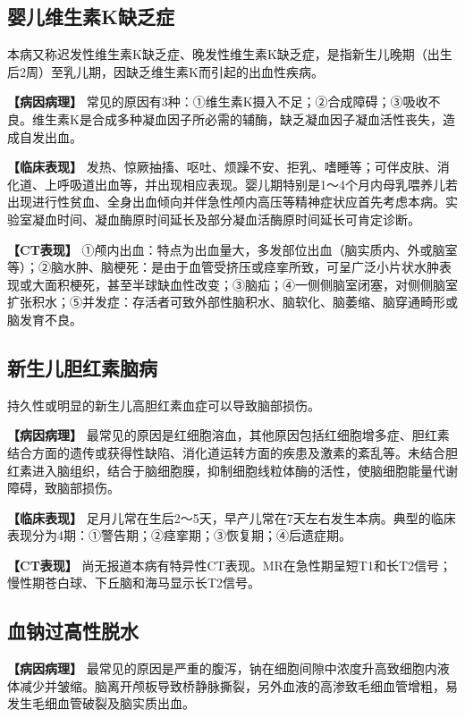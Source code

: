 \subsection{婴儿维生素K缺乏症}

本病又称迟发性维生素K缺乏症、晚发性维生素K缺乏症，是指新生儿晚期（出生后2周）至乳儿期，因缺乏维生素K而引起的出血性疾病。

\textbf{【病因病理】}
常见的原因有3种：①维生素K摄入不足；②合成障碍；③吸收不良。维生素K是合成多种凝血因子所必需的辅酶，缺乏凝血因子凝血活性丧失，造成自发出血。

\textbf{【临床表现】}
发热、惊厥抽搐、呕吐、烦躁不安、拒乳、嗜睡等；可伴皮肤、消化道、上呼吸道出血等，并出现相应表现。婴儿期特别是1～4个月内母乳喂养儿若出现进行性贫血、全身出血倾向并伴急性颅内高压等精神症状应首先考虑本病。实验室凝血时间、凝血酶原时间延长及部分凝血活酶原时间延长可肯定诊断。

\textbf{【CT表现】}
①颅内出血：特点为出血量大，多发部位出血（脑实质内、外或脑室等）；②脑水肿、脑梗死：是由于血管受挤压或痉挛所致，可呈广泛小片状水肿表现或大面积梗死，甚至半球缺血性改变；③脑疝；④一侧侧脑室闭塞，对侧侧脑室扩张积水；⑤并发症：存活者可致外部性脑积水、脑软化、脑萎缩、脑穿通畸形或脑发育不良。

\subsection{新生儿胆红素脑病}

持久性或明显的新生儿高胆红素血症可以导致脑部损伤。

\textbf{【病因病理】}
最常见的原因是红细胞溶血，其他原因包括红细胞增多症、胆红素结合方面的遗传或获得性缺陷、消化道运转方面的疾患及激素的紊乱等。未结合胆红素进入脑组织，结合于脑细胞膜，抑制细胞线粒体酶的活性，使脑细胞能量代谢障碍，致脑部损伤。

\textbf{【临床表现】}
足月儿常在生后2～5天，早产儿常在7天左右发生本病。典型的临床表现分为4期：①警告期；②痉挛期；③恢复期；④后遗症期。

\textbf{【CT表现】}
尚无报道本病有特异性CT表现。MR在急性期呈短T1和长T2信号；慢性期苍白球、下丘脑和海马显示长T2信号。

\subsection{血钠过高性脱水}

\textbf{【病因病理】}
最常见的原因是严重的腹泻，钠在细胞间隙中浓度升高致细胞内液体减少并皱缩。脑离开颅板导致桥静脉撕裂，另外血液的高渗致毛细血管增粗，易发生毛细血管破裂及脑实质出血。

